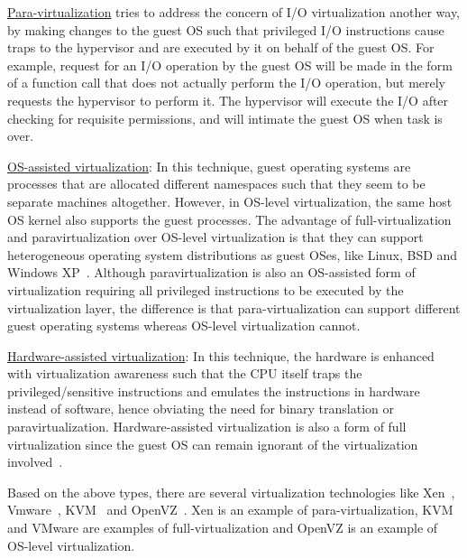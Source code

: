\underline{Para-virtualization} tries 
to address the concern of
I/O virtualization another way, by making changes to the guest
OS such that privileged I/O instructions cause traps to the hypervisor and are
executed by it on behalf of the guest OS. For example, request for an I/O
operation by the guest OS will
be made in the form of a function call that does not actually perform
the I/O operation, but merely requests the hypervisor to perform it.
The hypervisor will execute the I/O after checking for requisite permissions,
and will intimate the guest OS when task is over.

\underline{OS-assisted virtualization}: 
In this technique, guest operating systems are processes 
that are allocated different namespaces such that
they seem to be separate machines altogether. However, in OS-level
virtualization, the same host OS kernel also supports 
the guest processes.
The advantage of full-virtualization and paravirtualization over OS-level
virtualization is that they can support heterogeneous operating system
distributions as guest OSes, like Linux, BSD and Windows
XP~\cite{xen-art-of-virtualization}. 
Although paravirtualization is also an OS-assisted form of virtualization 
requiring all privileged instructions to be executed by the virtualization
layer, the difference is that para-virtualization can support
different guest operating systems whereas OS-level virtualization cannot.

\underline{Hardware-assisted virtualization}: 
In this technique,
the hardware is enhanced with virtualization awareness such that
the CPU itself traps the privileged/sensitive instructions and emulates
the instructions in hardware instead of software, hence obviating the need
for binary translation or paravirtualization. Hardware-assisted virtualization
is also a form of full virtualization since the guest OS can remain ignorant
of the virtualization involved~\cite{hardware-assisted-wiki}.

Based on the above
types, there are several virtualization technologies
like Xen~\cite{xen-art-of-virtualization},
Vmware~\cite{vmware-paravirtualization},
KVM~\cite{kvm} and OpenVZ~\cite{OpenVZ}. 
Xen is an
example of para-virtualization, KVM and VMware are examples of
full-virtualization and OpenVZ is an example of OS-level
virtualization.
